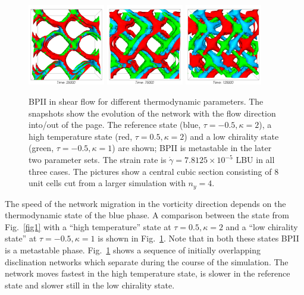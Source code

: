 \documentclass[12pt,twoside]{iopart}
\newcommand{\ex}[1]{\times10^{#1}}
\begin{document}
\begin{figure}[t]
\centering
\includegraphics[width=0.3\textwidth]{disc_bp2_tk_scan_25k.png}
\includegraphics[width=0.3\textwidth]{disc_bp2_tk_scan_75k.png}
\includegraphics[width=0.3\textwidth]{disc_bp2_tk_scan_125k.png}
\caption{BPII in shear flow for different thermodynamic parameters. The
snapshots show the evolution of the network with the flow direction into/out of
the page.  The reference state (blue, $\tau=-0.5, \kappa=2$), a high
temperature state (red, $\tau=0.5, \kappa=2$) and a low chirality state
(green, $\tau=-0.5, \kappa=1$) are shown; BPII is metastable in the later
two parameter sets.
The strain rate is $\dot{\gamma}=7.8125\ex{-5}$ LBU in all three cases.
The pictures show a central cubic section consisting of 8 unit cells cut
from a larger simulation with $n_y=4$.}
\label{fig2}
\end{figure}

The speed of the network migration in the vorticity direction depends on the
thermodynamic state of the blue phase.
A comparison between the state from Fig.~\ref{fig1} with a
``high temperature'' state at $\tau=0.5, \kappa=2$ and a
``low chirality state'' at $\tau=-0.5, \kappa=1$ is shown in
Fig.~\ref{fig2}. Note that in both these states BPII is a metastable phase. 
Fig.~\ref{fig2} shows a sequence of initially overlapping
disclination networks which separate during the course of the simulation.
The network moves fastest in the high temperature state, is slower in the
reference state and slower still in the low chirality state.
\end{document}

